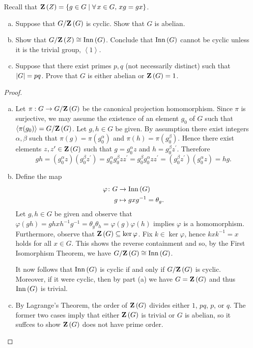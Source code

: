 \documentclass[10pt]{amsart}
\begin{document}
\begin{thm}
  Recall that $\mathbf{Z}\left(Z\right) = \left\{ g \in G \mid \forall\, x \in G, \, xg = gx \right\}$.
  \begin{enumerate}[(a)]
  \item
    Suppose that $G/\mathbf{Z}\left(G\right)$ is cyclic.  Show that $G$ is abelian.
  \item
    Show that $G/\mathbf{Z}\left(Z\right) \cong \operatorname{Inn}\left(G\right)$.  Conclude that $\operatorname{Inn}\left(G\right)$ cannot be cyclic unless it is the trivial group, $\left<1\right>$.
  \item
    Suppose that there exist primes $p,q$ (not necessarily distinct) such that $\left| G \right| = pq$.
    Prove that $G$ is either abelian or $\mathbf{Z}\left(G\right) = 1$.
  \end{enumerate}
  \begin{proof}
    \begin{enumerate}[(a)]
    \item
      Let $\pi: G \rightarrow G/\mathbf{Z}\left(G\right)$ be the canonical projection homomorphism.
      Since $\pi$ is surjective, we may assume the existence of an element $g_0$ of $G$ such that $\left< \pi(g_0) \right> = G/\mathbf{Z}\left(G\right)$.
      Let $g,h \in G$ be given.
      By assumption there exist integers $\alpha, \beta$ such that $\pi(g) = \pi(g_0^{\alpha})$ and $\pi(h) = \pi(g_0^{\beta})$.
      Hence there exist elements $z, z^{\prime} \in \mathbf{Z}\left(G\right)$ such that $g = g_0^{\alpha}z$ and $h = g_0^{\beta}z^{\prime}$.
      Therefore
      $$gh = (g_0^{\alpha}z)(g_0^{\beta}z^{\prime})
      = g_0^{\alpha}g_0^{\beta}zz^{\prime}
      = g_0^{\beta}g_0^{\alpha}zz^{\prime}
      = (g_0^{\beta}z^{\prime})(g_0^{\alpha}z)
      = hg.$$
    \item
      Define the map
      \begin{align*}
	\varphi \colon G &\rightarrow \operatorname{Inn}\left(G\right)\\
	g & \mapsto gxg^{-1} = \theta_g.
      \end{align*}
      Let $g,h \in G$ be given and observe that $\varphi(gh) = ghxh^{-1}g^{-1} = \theta_g\theta_h = \varphi(g)\varphi(h)$ implies $\varphi$ is a homomorphism.
      Furthermore, observe that $\mathbf{Z}\left(G\right) \subseteq \ker \varphi$.
      Fix $k \in \ker\varphi$, hence $kxk^{-1} = x$ holds for all $x \in G$.
      This shows the reverse containment and so, by the First Isomorphism Theorem, we have $G/\mathbf{Z}\left(G\right) \cong \operatorname{Inn}\left(G\right)$.
      
      It now follows that $\operatorname{Inn}\left(G\right)$ is cyclic if and only if $G/\mathbf{Z}\left(G\right)$ is cyclic.
      Moreover, if it were cyclic, then by part (a) we have $G = \mathbf{Z}\left(G\right)$ and thus $\operatorname{Inn}\left(G\right)$ is trivial.
    \item
      By Lagrange's Theorem, the order of $\mathbf{Z}\left(G\right)$ divides either $1$, $pq$, $p$, or $q$.
      The former two cases imply that either $\mathbf{Z}\left(G\right)$ is trivial or $G$ is abelian, so it suffces to show $\mathbf{Z}\left(G\right)$ does not have prime order.
      

\end{enumerate}
\end{proof}
\end{thm}
\end{document}
